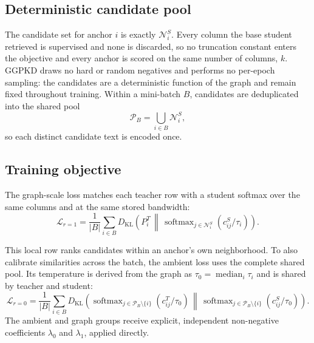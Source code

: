 \subsection{Deterministic candidate pool}
\label{sec:candidates}

The candidate set for anchor $i$ is exactly $\mathcal N_i^S$.
Every column the base student retrieved is supervised and none is discarded, so no
truncation constant enters the objective and every anchor is scored on the same
number of columns, $k$. GGPKD draws no hard or random negatives and performs no
per-epoch sampling: the candidates are a deterministic function of the graph and
remain fixed throughout training. Within a mini-batch $B$, candidates are
deduplicated into the shared pool
\begin{equation}
\mathcal P_B=\bigcup_{i\in B}\mathcal N_i^S,
\label{eq:shared-pool}
\end{equation}
so each distinct candidate text is encoded once.

\subsection{Training objective}
\label{sec:objective}

The graph-scale loss matches each teacher row with a student softmax over the
same columns and at the same stored bandwidth:
\begin{equation}
\mathcal L_{r=1}
=\frac{1}{|B|}\sum_{i\in B}
D_{\mathrm{KL}}\!\left(
P_i^T
\,\middle\|\,
\operatorname{softmax}_{j\in\mathcal N_i^S}(c_{ij}^S/\tau_i)
\right).
\label{eq:graph-loss}
\end{equation}

This local row ranks candidates within an anchor's own neighborhood. To also
calibrate similarities across the batch, the ambient loss uses the complete
shared pool. Its temperature is derived from the graph as
$\tau_0=\operatorname{median}_i\tau_i$ and is shared by teacher and student:
\begin{equation}
\mathcal L_{r=0}
=\frac{1}{|B|}\sum_{i\in B}
D_{\mathrm{KL}}\!\left(
\operatorname{softmax}_{j\in\mathcal P_B\setminus\{i\}}(c_{ij}^T/\tau_0)
\,\middle\|\,
\operatorname{softmax}_{j\in\mathcal P_B\setminus\{i\}}(c_{ij}^S/\tau_0)
\right).
\label{eq:ambient-loss}
\end{equation}
The ambient and graph groups receive explicit, independent non-negative
coefficients $\lambda_0$ and $\lambda_1$, applied directly.

